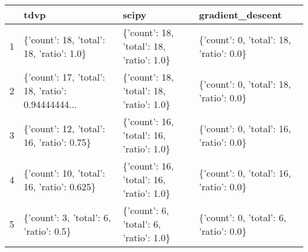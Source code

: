 \begin{tabular}{llll}
\toprule
{} &                                               tdvp &                                     scipy &                         gradient\_descent \\
\midrule
1 &           \{'count': 18, 'total': 18, 'ratio': 1.0\} &  \{'count': 18, 'total': 18, 'ratio': 1.0\} &  \{'count': 0, 'total': 18, 'ratio': 0.0\} \\
2 &  \{'count': 17, 'total': 18, 'ratio': 0.94444444... &  \{'count': 18, 'total': 18, 'ratio': 1.0\} &  \{'count': 0, 'total': 18, 'ratio': 0.0\} \\
3 &          \{'count': 12, 'total': 16, 'ratio': 0.75\} &  \{'count': 16, 'total': 16, 'ratio': 1.0\} &  \{'count': 0, 'total': 16, 'ratio': 0.0\} \\
4 &         \{'count': 10, 'total': 16, 'ratio': 0.625\} &  \{'count': 16, 'total': 16, 'ratio': 1.0\} &  \{'count': 0, 'total': 16, 'ratio': 0.0\} \\
5 &             \{'count': 3, 'total': 6, 'ratio': 0.5\} &    \{'count': 6, 'total': 6, 'ratio': 1.0\} &   \{'count': 0, 'total': 6, 'ratio': 0.0\} \\
\bottomrule
\end{tabular}
